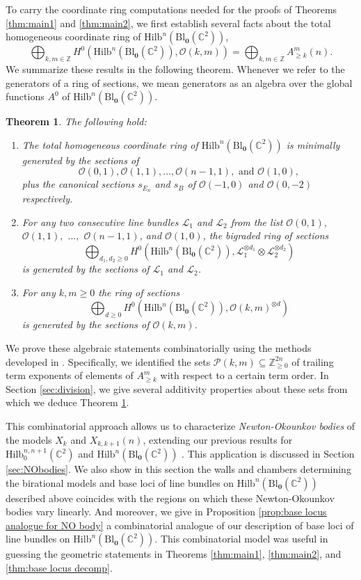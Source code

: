 \documentclass[12pt]{amsart}
\newcommand{\Hilb}{\mathrm{Hilb}}
\newcommand{\C}{\mathbb{C}}
\newcommand{\Z}{\mathbb{Z}}
\newcommand{\CL}{\mathcal{L}}
\newcommand{\CO}{\mathcal{O}}
\newcommand{\Bl}{\mathrm{Bl}}
\numberwithin{equation}{section}
\newtheorem{theorem}{Theorem}[section]
\theoremstyle{definition}
\begin{document}
To carry the coordinate ring computations needed for the proofs of Theorems \ref{thm:main1} and \ref{thm:main2}, we first establish several facts about the total homogeneous coordinate ring of $\Hilb^n(\Bl_\mathbf{0}(\C^2))$,
\[ \bigoplus_{k,m\in \Z} H^0(\Hilb^n(\Bl_\mathbf{0}(\C^2)),\CO(k,m)) = \bigoplus_{k,m\in \Z} A^m_{\geq k}(n). \]
We summarize these results in the following theorem. Whenever we refer to the generators of a ring of sections, we mean generators as an algebra over the global functions $A^0$ of $\Hilb^n(\Bl_\mathbf{0}(\C^2))$.

\begin{theorem}\label{thm:finitegenerationfacts}
    The following hold:
    \begin{enumerate}
        \item The total homogeneous coordinate ring of $\Hilb^n(\Bl_\mathbf{0}(\C^2))$ is minimally generated by the sections of 
        \[ \CO(0,1),\CO(1,1),\dots,\CO(n-1,1), \text{ and } \CO(1,0),\]
        plus the canonical sections $s_{E_n}$ and $s_B$ of $\CO(-1,0)$ and $\CO(0,-2)$ respectively.
        \item For any two consecutive line bundles  $\CL_1$ and $\CL_2$ from the list $\CO(0,1),$ $\CO(1,1),$ $\dots,$ $\CO(n-1,1)$, and $\CO(1,0)$, the bigraded ring of sections 
        \[ \bigoplus_{d_1,d_2\geq 0} H^0(\Hilb^n(\Bl_\mathbf{0}(\C^2)),\CL_1^{\otimes d_1}\otimes \CL_2^{\otimes d_2}) \]
        is generated by the sections of $\CL_1$ and $\CL_2$.
        \item For any $k,m\geq 0$ the ring of sections 
        \[ \bigoplus_{d\geq 0} H^0(\Hilb^n(\Bl_\mathbf{0}(\C^2)),\CO(k,m)^{\otimes d}) \]
        is generated by the sections of $\CO(k,m)$.
    \end{enumerate}
\end{theorem}

We prove these algebraic statements combinatorially using the methods developed in \cite{CGOT}. Specifically, we identified the sets $\mathcal{P}(k,m)\subseteq \Z^{2n}_{\geq 0}$ of trailing term exponents of elements of $A^m_{\geq k}$ with respect to a certain term order. In Section \ref{sec:division}, we give several additivity properties about these sets from which we deduce Theorem \ref{thm:finitegenerationfacts}.

This combinatorial approach allows us to characterize \emph{Newton-Okounkov bodies} of the models $X_k$ and $X_{k,k+1}(n)$, extending our previous results for $\Hilb^{n,n+1}_0(\C^2)$ and $\Hilb^n(\Bl_\mathbf{0}(\C^2))$ \cite{CGOT}. This application is discussed in Section \ref{sec:NObodies}. We also show in this section the walls and chambers determining the birational models and base loci of line bundles on $\Hilb^n(\Bl_\mathbf{0}(\C^2))$ described above coincides with the regions on which these Newton-Okounkov bodies vary linearly. And moreover, we give in Proposition \ref{prop:base locus analogue for NO body} a combinatorial analogue of our description of base loci of line bundles on $\Hilb^n(\Bl_\mathbf{0}(\C^2))$. This combinatorial model was useful in guessing the geometric statements in Theorems \ref{thm:main1}, \ref{thm:main2}, and \ref{thm:base locus decomp}. 
\end{document}
